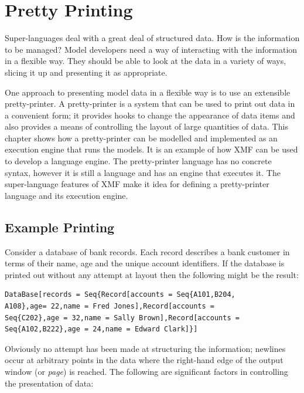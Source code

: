 
\chapter{Pretty Printing}

Super-languages deal with a great deal of structured data. How is
the information to be managed? Model developers need a way of interacting
with the information in a flexible way. They should be able to look
at the data in a variety of ways, slicing it up and presenting it
as appropriate.

One approach to presenting model data in a flexible way is to use
an extensible pretty-printer. A pretty-printer is a system that can
be used to print out data in a convenient form; it provides hooks
to change the appearance of data items and also provides a means of
controlling the layout of large quantities of data. This chapter shows
how a pretty-printer can be modelled and implemented as an execution
engine that runs the models. It is an example of how XMF can be used
to develop a language engine. The pretty-printer language has no concrete
syntax, however it is still a language and has an engine that executes
it. The super-language features of XMF make it idea for defining a
pretty-printer language and its execution engine.


\section{Example Printing}

Consider a database of bank records. Each record describes a bank
customer in terms of their name, age and the unique account identifiers.
If the database is printed out without any attempt at layout then
the following might be the result:

\begin{lstlisting}
DataBase[records = Seq{Record[accounts = Seq{A101,B204,
A108},age= 22,name = Fred Jones],Record[accounts = 
Seq{C202},age = 32,name = Sally Brown],Record[accounts = 
Seq{A102,B222},age = 24,name = Edward Clark]}]
\end{lstlisting}Obviously no attempt has been made at structuring the information;
newlines occur at arbitrary points in the data where the right-hand
edge of the output window (or \textit{page}) is reached. The following
are significant factors in controlling the presentation of data:

